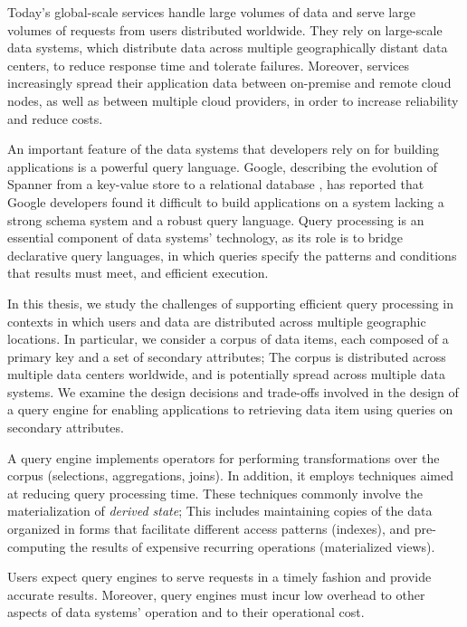 
Today's global-scale services handle large volumes of data and serve large volumes of requests from users distributed worldwide.
They rely on large-scale data systems,
which distribute data across multiple geographically distant data centers,
to reduce response time and tolerate failures.
Moreover, services increasingly spread their application data between on-premise and remote cloud nodes,
as well as between multiple cloud providers, in order to increase reliability and reduce costs.

An important feature of the data systems that developers rely on for building applications is a powerful query language.
Google, describing the evolution of Spanner from a key-value store to a relational database \cite{corbett:spanner},
has reported that Google developers found it difficult to build applications on a system lacking a strong schema system
and a robust query language.
Query processing is an essential component of data systems' technology, as its role is to bridge declarative query languages,
in which queries specify the patterns and conditions that results must meet, and efficient execution.

\bigskip
\noindent
In this thesis, we study the challenges of supporting efficient query processing in contexts in which users and data are
distributed across multiple geographic locations.
In particular, we consider a corpus of data items, each composed of a primary key and a set of secondary attributes;
The corpus is distributed across multiple data centers worldwide, and is potentially spread across multiple data systems.
We examine the design decisions and trade-offs involved in the design of a query engine for enabling applications to
retrieving data item using queries on secondary attributes.

A query engine implements operators for performing transformations over the corpus (selections, aggregations, joins).
In addition, it employs techniques aimed at reducing query processing time.
These techniques commonly involve the materialization of \textit{derived state};
This includes maintaining copies of the data organized in forms that facilitate different access patterns (indexes),
and pre-computing the results of expensive recurring operations (materialized views).

\bigskip
\noindent
Users expect query engines to serve requests in a timely fashion and provide accurate results.
Moreover, query engines must incur low overhead to other aspects of data systems' operation and to their operational cost.

